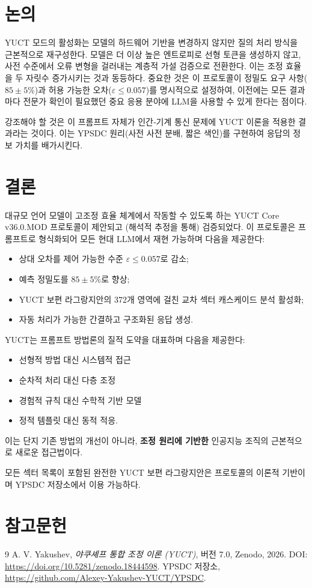 \documentclass[11pt,a4paper]{article}
\begin{document}
	\section{논의}
	YUCT 모드의 활성화는 모델의 하드웨어 기반을 변경하지 않지만 질의 처리 방식을 근본적으로 재구성한다. 모델은 더 이상 높은 엔트로피로 선형 토큰을 생성하지 않고, 사전 수준에서 오류 변형을 걸러내는 계층적 가설 검증으로 전환한다. 이는 조정 효율을 두 자릿수 증가시키는 것과 동등하다. 중요한 것은 이 프로토콜이 정밀도 요구 사항($85\pm5\%$)과 허용 가능한 오차($\varepsilon\le 0.057$)를 명시적으로 설정하여, 이전에는 모든 결과마다 전문가 확인이 필요했던 중요 응용 분야에 LLM을 사용할 수 있게 한다는 점이다.
	
	강조해야 할 것은 이 프롬프트 자체가 인간‑기계 통신 문제에 YUCT 이론을 적용한 결과라는 것이다. 이는 YPSDC 원리(사전 사전 분배, 짧은 색인)를 구현하여 응답의 정보 가치를 배가시킨다.
	
	\section{결론}
	대규모 언어 모델이 고조정 효율 체계에서 작동할 수 있도록 하는 YUCT Core v36.0.MOD 프로토콜이 제안되고 (해석적 추정을 통해) 검증되었다. 이 프로토콜은 프롬프트로 형식화되어 모든 현대 LLM에서 재현 가능하며 다음을 제공한다:
	\begin{itemize}
		\item 상대 오차를 제어 가능한 수준 $\varepsilon \le 0.057$로 감소;
		\item 예측 정밀도를 $85\pm5\%$로 향상;
		\item YUCT 보편 라그랑지안의 372개 영역에 걸친 교차 섹터 캐스케이드 분석 활성화;
		\item 자동 처리가 가능한 간결하고 구조화된 응답 생성.
	\end{itemize}
	
	YUCT는 프롬프트 방법론의 질적 도약을 대표하며 다음을 제공한다:
	\begin{itemize}
		\item 선형적 방법 대신 시스템적 접근
		\item 순차적 처리 대신 다층 조정
		\item 경험적 규칙 대신 수학적 기반 모델
		\item 정적 템플릿 대신 동적 적응.
	\end{itemize}
	
	이는 단지 기존 방법의 개선이 아니라, \textbf{조정 원리에 기반한} 인공지능 조직의 근본적으로 새로운 접근법이다.
	
	모든 섹터 목록이 포함된 완전한 YUCT 보편 라그랑지안은 프로토콜의 이론적 기반이며 YPSDC 저장소에서 이용 가능하다.
	
	\section*{참고문헌}
	\begin{thebibliography}{9}
		A. V. Yakushev, \emph{야쿠셰프 통합 조정 이론 (YUCT)}, 버전 7.0, Zenodo, 2026. DOI: \url{https://doi.org/10.5281/zenodo.18444598}.
		YPSDC 저장소, \url{https://github.com/Alexey-Yakushev-YUCT/YPSDC}.
	\end{thebibliography}
	
\end{document}
